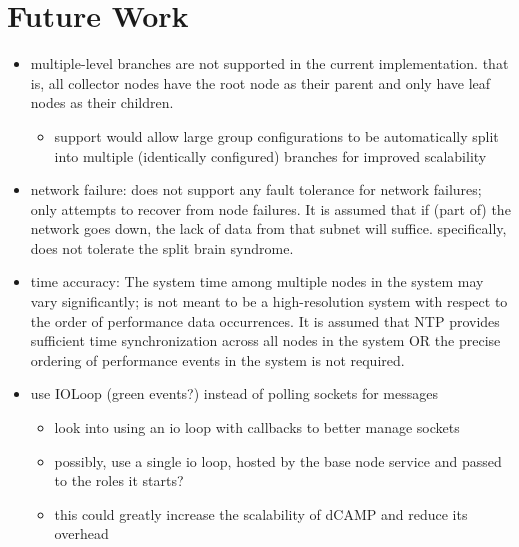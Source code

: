 \chapter{Future Work}
\label{future_work}

\begin{itemize}

\item multiple-level branches are not supported in the current implementation. that is, all collector nodes have the
      root node as their parent and only have leaf nodes as their children.
      \begin{itemize}
      \item support would allow large group configurations to be automatically split into multiple (identically
            configured) branches for improved scalability
      \end{itemize}

\item network failure: \dcamp does not support any fault tolerance for network failures; \dcamp only attempts to recover
from node failures. It is assumed that if (part of) the network goes down, the lack of data from that subnet will
suffice. specifically, \dcamp does not tolerate the split brain syndrome\cite{needed}.

\item time accuracy: The system time among multiple nodes in the system may vary significantly; \dcamp is not meant to
be a high-resolution system with respect to the order of performance data occurrences. It is assumed that NTP provides
sufficient time synchronization across all nodes in the system OR the precise ordering of performance events in the
system is not required.

\item use IOLoop (green events?) instead of polling sockets for messages
      \begin{itemize}
      \item look into using an io loop with callbacks to better manage sockets
      \item possibly, use a single io loop, hosted by the base node service and passed to the roles it starts?
      \item this could greatly increase the scalability of dCAMP and reduce its overhead
      \end{itemize}


\end{itemize}

